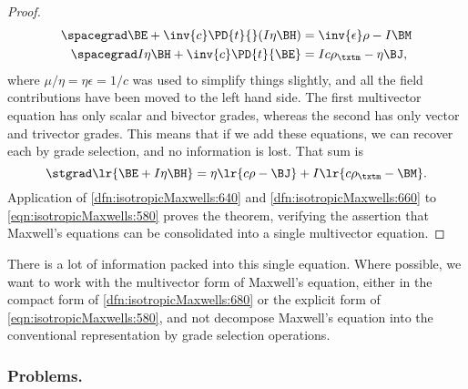 \begin{proof}
\begin{equation}\label{eqn:isotropicMaxwells:560}
\begin{aligned}
\spacegrad \BE        + \inv{c} \PD{t}{} (I \eta \BH) &= \inv{\epsilon}\rho - I \BM  \\
\spacegrad I \eta \BH + \inv{c} \PD{t}{\BE}           &= I c \rho_\txtm - \eta \BJ,
\end{aligned}
\end{equation}
where \( \mu/\eta = \eta \epsilon = 1/c \) was used to simplify things slightly, and all the field contributions have been moved to the left hand side.
The first multivector equation has only scalar and bivector grades, whereas the second has only vector and trivector grades.  This means that if we add these equations, we can recover each by grade selection, and no information is lost.  That sum is
\begin{equation}\label{eqn:isotropicMaxwells:580}
\stgrad \lr{ \BE + I \eta \BH } = \eta\lr{ c \rho - \BJ } + I \lr{ c \rho_\txtm - \BM }.
\end{equation}
Application of \cref{dfn:isotropicMaxwells:640} and \cref{dfn:isotropicMaxwells:660} to
\cref{eqn:isotropicMaxwells:580} proves the theorem, verifying the
assertion that Maxwell's equations can be consolidated into a single multivector equation.
\end{proof}
There is a lot of information packed into this single equation.
Where possible, we want to work with the multivector form of Maxwell's equation, either in the
compact form of \cref{dfn:isotropicMaxwells:680} or the explicit form of \cref{eqn:isotropicMaxwells:580},
and not decompose Maxwell's equation into the conventional representation by grade selection operations.

\subsubsection{Problems.}
